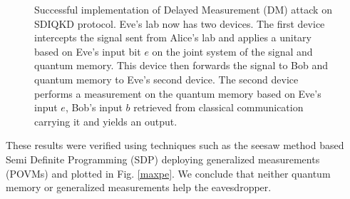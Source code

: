 \documentclass[smallextended]{svjour3}
\begin{document}
\begin{figure}[htp]
\centering
{}
\caption{ Successful implementation of Delayed Measurement (DM) attack on SDIQKD protocol. 
Eve's lab now has two devices. The first device intercepts the signal sent from Alice's lab and applies a unitary based on Eve's input bit $e$ on the joint system of the signal and quantum memory. This device then forwards the signal to Bob and quantum memory to Eve's second device. The second device performs a measurement on the quantum memory based on Eve's input $e$, Bob's input $b$ retrieved from classical communication carrying it and yields an output. }
\label{24}
\end{figure}
These results were verified using techniques such as the seesaw method based Semi Definite Programming (SDP) \cite{dist1,dist2,dist3} deploying generalized measurements (POVMs) and plotted in Fig. \ref{maxpe}. We conclude that neither quantum memory or generalized measurements help the eavesdropper. 
\end{document}
